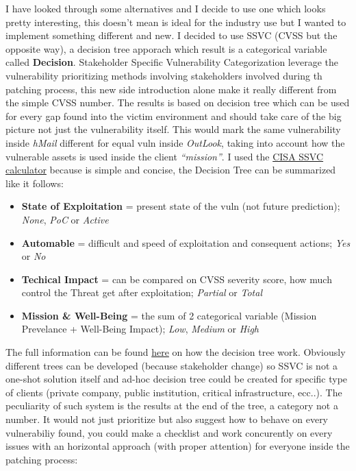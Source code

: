 \documentclass[a4paper]{article}
\def\tightlist{}
\begin{document}
I have looked through some alternatives and I decide to use one which looks pretty interesting, this doesn't mean is ideal for the industry
use but I wanted to implement something different and new. I decided to use SSVC (CVSS but the opposite way), a decision tree apporach which result
is a categorical variable called \textbf{Decision}. Stakeholder Specific Vulnerability Categorization leverage the vulnerability prioritizing methods
involving stakeholders involved during th patching process, this new side introduction alone make it really different from the simple CVSS number.
The results is based on decision tree which can be used for every gap found into the victim environment and should take care of the big picture not
just the vulnerability itself. This would mark the same vulnerability inside \emph{hMail} different for equal vuln inside \emph{OutLook}, taking into account
how the vulnerable assets is used inside the client \emph{``mission''}. I used the \href{https://www.cisa.gov/ssvc-calculator}{CISA SSVC calculator} because is simple
and concise, the Decision Tree can be summarized like it follows:

\begin{itemize}
\tightlist
\item
  \textbf{State of Exploitation} = present state of the vuln (not future prediction); \emph{None}, \emph{PoC} or \emph{Active}
\item
  \textbf{Automable} = difficult and speed of exploitation and consequent actions; \emph{Yes} or \emph{No}
\item
  \textbf{Techical Impact} = can be compared on CVSS severity score, how much control the Threat get after exploitation; \emph{Partial} or \emph{Total}
\item
  \textbf{Mission \& Well-Being} = the sum of 2 categorical variable (Mission Prevelance + Well-Being Impact); \emph{Low}, \emph{Medium} or \emph{High}
\end{itemize}

The full information can be found \href{https://www.cisa.gov/sites/default/files/publications/cisa-ssvc-guide\%20508c.pdf}{here} on how the decision tree work.
Obviously different trees can be developed (because stakeholder change) so SSVC is not a one-shot solution itself and ad-hoc decision tree could be created
for specific type of clients (private company, public institution, critical infrastructure, ecc..). The peculiarity of such system is the results at the end
of the tree, a category not a number. It would not just prioritize but also suggest how to behave on every vulnerabiliy found, you could make a checklist and
work concurently on every issues with an horizontal approach (with proper attention) for everyone inside the patching process:
\end{document}
